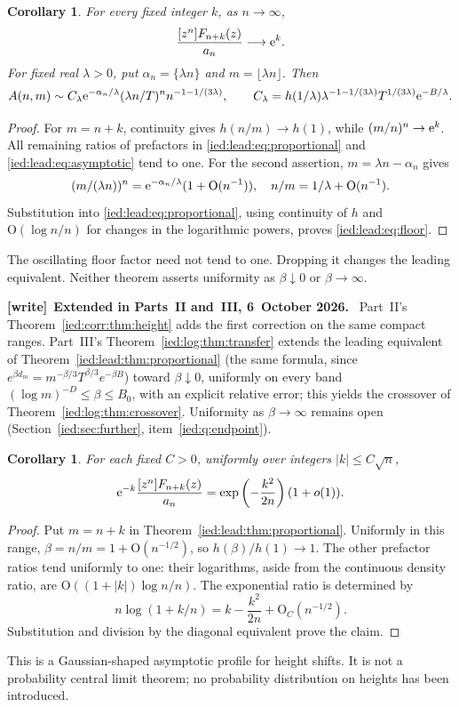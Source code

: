 \documentclass[11pt,letterpaper]{article}
\newtheorem{corollary}[theorem]{Corollary}
\theoremstyle{remark}\newtheorem{remark}[theorem]{Remark}
\newcommand{\Oh}{\mathrm O}\newcommand{\supp}{\operatorname{supp}}
\newenvironment{writenote}[1][]{\par\smallskip\begingroup\small
 \noindent\textbf{[write]}\if\relax\detokenize{#1}\relax\else~\textbf{#1.}\fi\ }%
 {\par\endgroup\smallskip}
\begin{document}
\begin{corollary}\label{ied:lead:cor:shifts}
For every fixed integer $k$, as $n\to\infty$,
\[
 \frac{[z^n]F_{n+k}(z)}{a_n}\longrightarrow\mathrm e^k.
\]
For fixed real $\lambda>0$, put $\alpha_n=\{\lambda n\}$ and $m=\lfloor\lambda n\rfloor$. Then
\begin{equation}\label{ied:lead:eq:floor}
 A(n,m)\sim C_\lambda\mathrm e^{-\alpha_n/\lambda}
       (\lambda n/T)^n n^{-1-1/(3\lambda)},
 \qquad
 C_\lambda=h(1/\lambda)\lambda^{-1-1/(3\lambda)}
               T^{1/(3\lambda)}\mathrm e^{-B/\lambda}.
\end{equation}
\end{corollary}
\begin{proof}
For $m=n+k$, continuity gives $h(n/m)\to h(1)$, while $(m/n)^n\to\mathrm e^k$. All remaining ratios of prefactors in \eqref{ied:lead:eq:proportional} and \eqref{ied:lead:eq:asymptotic} tend to one. For the second assertion, $m=\lambda n-\alpha_n$ gives
\[
 (m/(\lambda n))^n=\e^{-\alpha_n/\lambda}(1+\Oh(n^{-1})),
 \quad n/m=1/\lambda+\Oh(n^{-1}).
\]
Substitution into \eqref{ied:lead:eq:proportional}, using continuity of $h$ and $\Oh(\log n/n)$ for changes in the logarithmic powers, proves \eqref{ied:lead:eq:floor}.
\end{proof}
The oscillating floor factor need not tend to one. Dropping it changes the leading equivalent. Neither theorem asserts uniformity as $\beta\downarrow0$ or $\beta\to\infty$.

\begin{writenote}[Extended in Parts~II and~III, 6~October 2026]
Part~II's Theorem~\ref{ied:corr:thm:height} adds the first correction on the same compact ranges. Part~III's Theorem~\ref{ied:log:thm:transfer} extends the leading equivalent of Theorem~\ref{ied:lead:thm:proportional} (the same formula, since $e^{\beta d_m}=m^{-\beta/3}T^{\beta/3}e^{-\beta B}$) toward $\beta\downarrow0$, uniformly on every band $(\log m)^{-D}\le\beta\le B_0$, with an explicit relative error; this yields the crossover of Theorem~\ref{ied:log:thm:crossover}. Uniformity as $\beta\to\infty$ remains open (Section~\ref{ied:sec:further}, item~\ref{ied:q:endpoint}).
\end{writenote}

\begin{corollary}\label{ied:lead:cor:window}
For each fixed $C>0$, uniformly over integers $|k|\le C\sqrt n$,
\[
 \mathrm e^{-k}\frac{[z^n]F_{n+k}(z)}{a_n}
 =\exp\left(-\frac{k^2}{2n}\right)(1+o(1)).
\]
\end{corollary}
\begin{proof}
Put $m=n+k$ in Theorem~\ref{ied:lead:thm:proportional}. Uniformly in this range, $\beta=n/m=1+\Oh(n^{-1/2})$, so $h(\beta)/h(1)\to1$. The other prefactor ratios tend uniformly to one: their logarithms, aside from the continuous density ratio, are $\Oh((1+|k|)\log n/n)$. The exponential ratio is determined by
\[
 n\log(1+k/n)=k-\frac{k^2}{2n}+\Oh_C(n^{-1/2}).
\]
Substitution and division by the diagonal equivalent prove the claim.
\end{proof}
This is a Gaussian-shaped asymptotic profile for height shifts. It is not a probability central limit theorem; no probability distribution on heights has been introduced.
\end{document}
